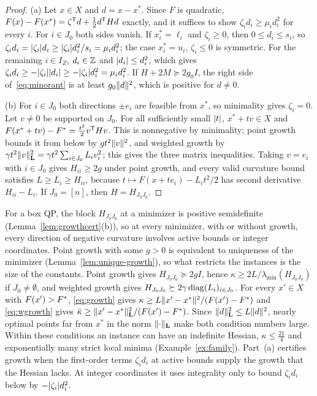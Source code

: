 \begin{proof}
(a) Let $x\in X$ and $d=x-x^*$. Since $F$ is quadratic,
$F(x)-F(x^*)=\zeta^{\mathsf T}d+\frac12d^{\mathsf T}Hd$ exactly, and it suffices to show
$\zeta_id_i\ge\mu_id_i^2$ for every $i$. For $i\in J_0$ both sides vanish. If
$x_i^*=\ell_i$ and $\zeta_i\ge0$, then $0\le d_i\le s_i$, so
$\zeta_id_i=\lvert \zeta_i\rvert d_i\ge\lvert \zeta_i\rvert d_i^2/s_i=\mu_id_i^2$; the case
$x_i^*=u_i$, $\zeta_i\le0$ is symmetric. For the remaining $i\in I_Z$, $d_i\in\mathbb Z$
and $\lvert d_i\rvert\le d_i^2$, which gives
$\zeta_id_i\ge-\lvert \zeta_i\rvert\lvert d_i\rvert\ge-\lvert \zeta_i\rvert d_i^2=\mu_id_i^2$. If
$H+2M\succeq2g_0I$, the right side of~\eqref{eq:minorant} is at least
$g_0\lVert d\rVert^2$, which is positive for $d\ne0$.

(b) For $i\in J_0$ both directions $\pm e_i$ are feasible from $x^*$, so
minimality gives $\zeta_i=0$. Let $v\ne0$ be supported on $J_0$. For all
sufficiently small $\lvert t\rvert$, $x^*+tv\in X$ and
$F(x^*+tv)-F^{*}=\frac{t^2}2v^{\mathsf T}Hv$. This is nonnegative by minimality;
point growth bounds it from below by $gt^2\lVert v\rVert^2$, and weighted growth by
$\gamma t^2\lVert v\rVert_{\mathbf L}^2=\gamma t^2\sum_{i\in J_0}L_iv_i^2$; this gives
the three matrix inequalities. Taking $v=e_i$ with $i\in J_0$ gives
$H_{ii}\ge2g$ under point growth, and every valid curvature bound satisfies
$L\ge L_i\ge H_{ii}$, because $t\mapsto F(x+te_i)-L_it^2/2$ has second
derivative $H_{ii}-L_i$. If $J_0=[n]$, then $H=H_{J_0J_0}$.
\end{proof}

\begin{remark}\label{rem:nonconvex}
For a box QP, the block $H_{J_0J_0}$ at a minimizer is positive semidefinite
(Lemma~\ref{lem:growthcert}(b)), so at every minimizer, with or without
growth, every direction of negative curvature involves active bounds or
integer coordinates. Point growth with some $g>0$ is equivalent to
uniqueness of the minimizer (Lemma~\ref{lem:unique-growth}), so what
restricts the instances is the size of the constants. Point growth gives
$H_{J_0J_0}\succeq2gI$, hence $\kappa\ge2L/\lambda_{\min}(H_{J_0J_0})$ if
$J_0\ne\emptyset$, and weighted growth gives
$H_{J_0J_0}\succeq2\gamma\operatorname{diag}(L_i)_{i\in J_0}$. For every $x'\in X$ with
$F(x')>F^{*}$, \eqref{eq:growth} gives
$\kappa\ge L\lVert x'-x^*\rVert^2/(F(x')-F^{*})$ and \eqref{eq:wgrowth} gives
$\bar\kappa\ge\lVert x'-x^*\rVert_{\mathbf L}^2/(F(x')-F^{*})$. Since
$\lVert d\rVert_{\mathbf L}^2\le L\lVert d\rVert^2$, nearly optimal points far from $x^*$
in the norm $\lVert \cdot\rVert_{\mathbf L}$ make both condition numbers large.
Within these conditions an instance can have an indefinite Hessian,
$\kappa\le\frac{21}4$ and exponentially many strict local minima
(Example~\ref{ex:family}).
Part~(a) certifies growth when the first-order terms $\zeta_id_i$ at active
bounds supply the growth that the Hessian lacks. At integer coordinates it
uses integrality only to bound $\zeta_id_i$ below by $-\lvert \zeta_i\rvert d_i^2$.
\end{remark}
